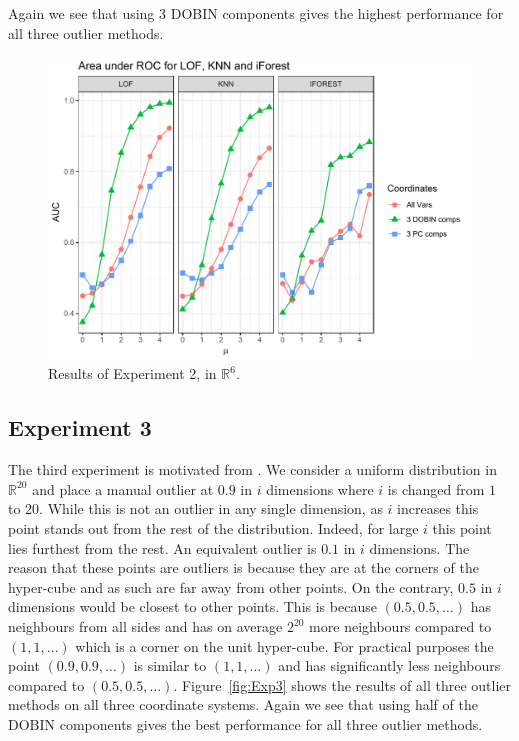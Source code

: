 \documentclass[a4paper,11pt]{article}
\begin{document}
Again we see that using 3 DOBIN components gives the highest performance for all three outlier methods. %

\begin{figure}[!ht]
	\centering
	\includegraphics[scale=0.5]{Exp2.pdf}
	\caption{Results of Experiment 2, in $\mathbb{R}^6$.}
	\label{fig:Exp2}
\end{figure}

\subsection{Experiment 3}
The third experiment is motivated from \cite{zimek2012survey}. We consider a uniform distribution in $\mathbb{R}^{20}$ and place a manual outlier at $0.9$ in $i$ dimensions where $i$ is changed from $1$ to $20$. While this is not an outlier in any single dimension, as $i$ increases this point stands out from the rest of the distribution. Indeed, for large $i$ this  point lies furthest from the rest. An equivalent outlier is $0.1$ in $i$ dimensions. The reason that these points are outliers is because they are at the corners of the hyper-cube and as such are far away from other points. On the contrary, $0.5$ in $i$ dimensions would be closest to other points. This is because $(0.5, 0.5, \ldots)$ has neighbours from all sides and has on average $2^{20}$ more neighbours compared to $(1, 1, \ldots)$  which is a corner on the unit hyper-cube. For practical purposes the point $(0.9, 0.9, \ldots)$ is similar to $(1, 1, \ldots)$ and has significantly less neighbours compared to $(0.5, 0.5, \ldots)$. Figure~\ref{fig:Exp3} shows the results of all three outlier methods on all three coordinate systems. Again we see that using half of the DOBIN components gives the best performance for all three outlier methods.
\end{document}
